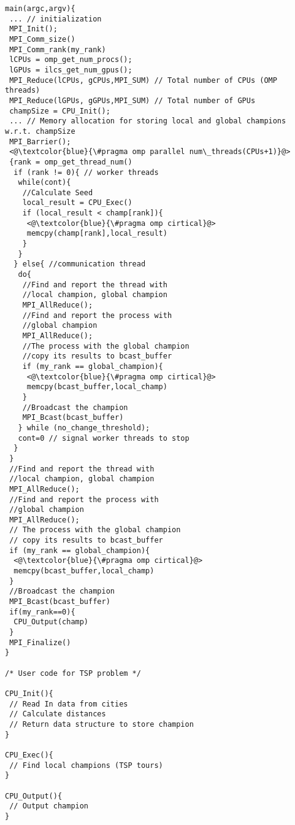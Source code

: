 
\begin{frame}{}
  \lstset{language=C}
 \begin{lstlisting}
main(argc,argv){
 ... // initialization
 MPI_Init();
 MPI_Comm_size()
 MPI_Comm_rank(my_rank)
 lCPUs = omp_get_num_procs();
 lGPUs = ilcs_get_num_gpus();
 MPI_Reduce(lCPUs, gCPUs,MPI_SUM) // Total number of CPUs (OMP threads)
 MPI_Reduce(lGPUs, gGPUs,MPI_SUM) // Total number of GPUs
 champSize = CPU_Init();
 ... // Memory allocation for storing local and global champions w.r.t. champSize
 MPI_Barrier();
 <@\textcolor{blue}{\#pragma omp parallel num\_threads(CPUs+1)}@>
 {rank = omp_get_thread_num()
  if (rank != 0){ // worker threads
   while(cont){
    //Calculate Seed
    local_result = CPU_Exec()
    if (local_result < champ[rank]){
     <@\textcolor{blue}{\#pragma omp cirtical}@>
     memcpy(champ[rank],local_result)
    }
   }
  } else{ //communication thread
   do{
    //Find and report the thread with 
    //local champion, global champion
    MPI_AllReduce();
    //Find and report the process with
    //global champion
    MPI_AllReduce();	
    //The process with the global champion
    //copy its results to bcast_buffer	
    if (my_rank == global_champion){
     <@\textcolor{blue}{\#pragma omp cirtical}@>
     memcpy(bcast_buffer,local_champ)
    }
    //Broadcast the champion
    MPI_Bcast(bcast_buffer)
   } while (no_change_threshold);
   cont=0 // signal worker threads to stop
  }
 }
 //Find and report the thread with 
 //local champion, global champion
 MPI_AllReduce();
 //Find and report the process with 
 //global champion
 MPI_AllReduce();
 // The process with the global champion
 // copy its results to bcast_buffer	
 if (my_rank == global_champion){
  <@\textcolor{blue}{\#pragma omp cirtical}@>
  memcpy(bcast_buffer,local_champ)
 }
 //Broadcast the champion
 MPI_Bcast(bcast_buffer)
 if(my_rank==0){
  CPU_Output(champ)
 }
 MPI_Finalize()
}

/* User code for TSP problem */

CPU_Init(){
 // Read In data from cities
 // Calculate distances
 // Return data structure to store champion
}

CPU_Exec(){
 // Find local champions (TSP tours)
}

CPU_Output(){
 // Output champion
}


\end{lstlisting}
\end{frame}

